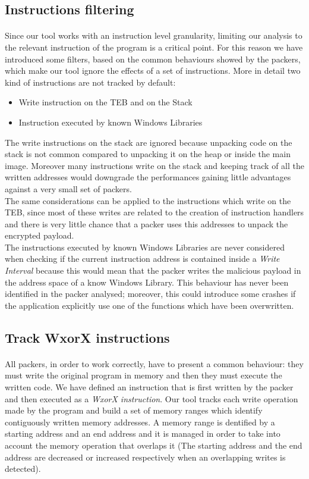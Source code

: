 \subsection{Instructions filtering}
\paragraph{}
Since our tool works with an instruction level granularity, limiting our analysis to the relevant instruction of the program is a critical point. For this reason we have introduced some filters, based on the common behaviours showed by the packers, which make our tool ignore the effects of a set of instructions. More in detail two kind of instructions are not tracked by default:
\begin{itemize}
	\item Write instruction on the \ac{TEB} and on the Stack
	\item Instruction executed by known Windows Libraries
\end{itemize}
The write instructions on the stack are ignored because unpacking code on the stack is not common compared to unpacking it on the heap or inside the main image. Moreover many instructions write on the stack and keeping track of all the written addresses would downgrade the performances gaining little advantages against a very small set of packers.\\
The same considerations can be applied to the instructions which write on the \ac{TEB}, since most of these writes are related to the creation of instruction handlers and there is very little chance that a packer uses this addresses to unpack the encrypted payload.\\
The instructions executed by known Windows Libraries are never considered when checking if the current instruction address is contained inside a \textit{Write Interval} because this would mean that the packer writes the malicious payload in the address space of a know Windows Library. This behaviour has never been identified in the packer analysed; moreover, this could introduce some crashes if the application explicitly use one of the functions which have been overwritten.

\subsection{Track WxorX instructions}
\paragraph{}
All packers, in order to work correctly, have to present a common behaviour: they must write the original program in memory and then they must execute the written code. We have defined an instruction that is first written by the packer and then executed as a \textit{WxorX instruction}.
Our tool tracks each write operation made by the program and build a set of memory ranges which identify contiguously written memory addresses. A memory range is dentified by a starting address and an end address and it is managed in order to take into account the memory operation that overlaps it (The starting address and the end address are decreased or increased 
respectively when an overlapping writes is detected).

